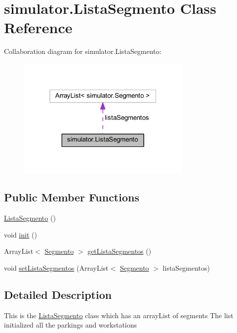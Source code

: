\hypertarget{classsimulator_1_1_lista_segmento}{}\section{simulator.\+Lista\+Segmento Class Reference}
\label{classsimulator_1_1_lista_segmento}


Collaboration diagram for simulator.\+Lista\+Segmento\+:\nopagebreak
\begin{figure}[H]
\begin{center}
\leavevmode
\includegraphics[width=241pt]{classsimulator_1_1_lista_segmento__coll__graph}
\end{center}
\end{figure}
\subsection*{Public Member Functions}
\begin{DoxyCompactItemize}
\item 
\mbox{\hyperlink{classsimulator_1_1_lista_segmento_af57e1ba52661c323d60e8a9f41f1042c}{Lista\+Segmento}} ()
\item 
void \mbox{\hyperlink{classsimulator_1_1_lista_segmento_a92b11e2e8cfcf09d45146e9771f87dea}{init}} ()
\item 
Array\+List$<$ \mbox{\hyperlink{classsimulator_1_1_segmento}{Segmento}} $>$ \mbox{\hyperlink{classsimulator_1_1_lista_segmento_ab699a3169c41d7baac0f86e47c0df66e}{get\+Lista\+Segmentos}} ()
\item 
void \mbox{\hyperlink{classsimulator_1_1_lista_segmento_a029655e5d0c31702beeba7834d024c43}{set\+Lista\+Segmentos}} (Array\+List$<$ \mbox{\hyperlink{classsimulator_1_1_segmento}{Segmento}} $>$ lista\+Segmentos)
\end{DoxyCompactItemize}


\subsection{Detailed Description}
This is the \mbox{\hyperlink{classsimulator_1_1_lista_segmento}{Lista\+Segmento}} class which has an array\+List of segments The list initialized all the parkings and workstations


